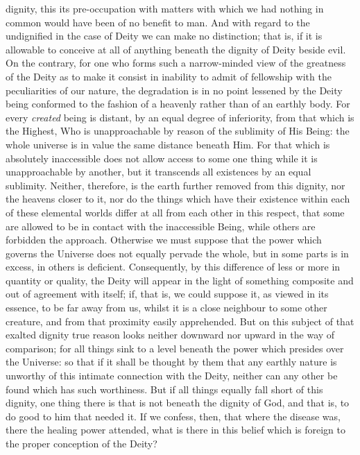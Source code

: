 dignity, this its pre-occupation with matters with which we had nothing in common would have been of no benefit to man. And with regard to the undignified in the case of Deity we can make no distinction; that is, if it is allowable to conceive at all of anything beneath the dignity of Deity beside evil. On the contrary, for one who forms such a narrow-minded view of the greatness of the Deity as to make it consist in inability to admit of fellowship with the peculiarities of our nature, the degradation is in no point lessened by the Deity being conformed to the fashion of a heavenly rather than of an earthly body. For every \emph{created} being is distant, by an equal degree of inferiority, from that which is the Highest, Who is unapproachable by reason of the sublimity of His Being: the whole universe is in value the same distance beneath Him. For that which is absolutely inaccessible does not allow access to some one thing while it is unapproachable by another, but it transcends all existences by an equal sublimity. Neither, therefore, is the earth further removed from this dignity, nor the heavens closer to it, nor do the things which have their existence within each of these elemental worlds differ at all from each other in this respect, that some are allowed to be in contact with the inaccessible Being, while others are forbidden the approach. Otherwise we must suppose that the power which governs the Universe does not equally pervade the whole, but in some parts is in excess, in others is deficient. Consequently, by this difference of less or more in quantity or quality, the Deity will appear in the light of something composite and out of agreement with itself; if, that is, we could suppose it, as viewed in its essence, to be far away from us, whilst it is a close neighbour to some other creature, and from that proximity easily apprehended. But on this subject of that exalted dignity true reason looks neither downward nor upward in the way of comparison; for all things sink to a level beneath the power which presides over the Universe: so that if it shall be thought by them that any earthly nature is unworthy of this intimate connection with the Deity, neither can any other be found which has such worthiness. But if all things equally fall short of this dignity, one thing there is that is not beneath the dignity of God, and that is, to do good to him that needed it. If we confess, then, that where the disease was, there the healing power attended, what is there in this belief which is foreign to the proper conception of the Deity?

